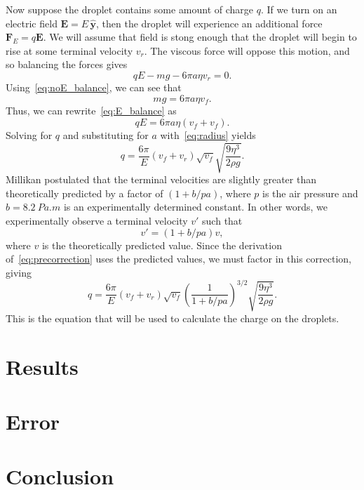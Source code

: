 \documentclass[aps, reprint,amsmath,amssymb]{revtex4-1} %
\renewcommand{\vec}[1]{\mathbf{#1}}
\newcommand{\y}{\vec{\hat{y}}}
\begin{document}
Now suppose the droplet contains some amount of charge $q$. If we turn on
an electric field $\vec{E} = E\,\y$, then the droplet will experience
an additional force $\vec{F}_E = q\vec{E}$. We will assume that field is
stong enough that the droplet will begin to rise at some terminal velocity
$v_r$. The viscous force will oppose this motion, and so balancing the
forces gives
\begin{equation}\label{eq:E_balance}
    qE - mg - 6\pi a \eta v_r = 0.
\end{equation}
Using~\eqref{eq:noE_balance}, we can see that
\[
    m g = 6\pi a \eta v_f.
\]
Thus, we can rewrite~\eqref{eq:E_balance} as
\begin{equation}
    qE = 6\pi a \eta (v_f + v_f).
\end{equation}
Solving for $q$ and substituting for $a$ with~\eqref{eq:radius} yields
\begin{equation}\label{eq:precorrection}
    q = \frac{6\pi}{E} (v_f + v_r) \sqrt{v_f} \sqrt{\frac{9 \eta^3}{2\rho
    g}}.
\end{equation}
Millikan postulated that the terminal velocities are slightly greater than
theoretically predicted by a factor of $(1 + b/pa)$, where $p$ is the air
pressure and $b = \SI{8.2}{Pa.m}$ is an experimentally determined constant.
In other words, we experimentally observe a terminal velocity $v'$ such
that
\[
    v' = (1 + b/pa) v,
\]
where $v$ is the theoretically predicted value. Since the derivation
of~\eqref{eq:precorrection} uses the predicted values, we must factor in
this correction, giving
\begin{equation} \label{eq:charge}
    q = \frac{6\pi}{E} (v_f + v_r) \sqrt{v_f} 
    \left( \frac{1}{1 + b/pa} \right)^{3/2}
    \sqrt{\frac{9\eta^3}{2\rho g}}.
\end{equation}
This is the equation that will be used to calculate the charge on the
droplets.

\section{Results}


\section{Error}

\section{Conclusion}
\end{document}
